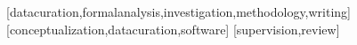 \documentclass[portuguese]{textolivre}
\begin{document}







\printbibliography\label{sec-bib}


\begin{contributors}
[datacuration,formalanalysis,investigation,methodology,writing]
[conceptualization,datacuration,software]
[supervision,review]
\end{contributors}


\end{document}
